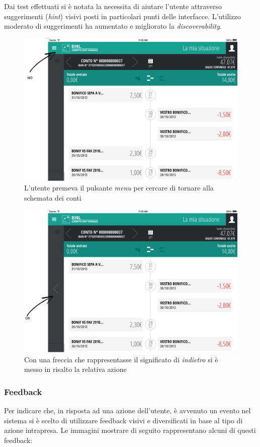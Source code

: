 Dai test effettuati si è notata la necessita di aiutare l'utente attraverso suggerimenti (\emph{hint}) visivi posti in particolari punti delle interfacce. L'utilizzo moderato di suggerimenti ha aumentato e migliorato la \emph{discoverability}. 
\begin{figure}[!htbp]
\centering
\includegraphics[scale=0.30]{ux/timelinenohint.png}
\caption{L'utente premeva il pulsante \emph{menu} per cercare di tornare alla schemata dei conti}
\end{figure}
\begin{figure}[!htbp]
\centering
\includegraphics[scale=0.30]{ux/timelinehint.png}
\caption{Con una freccia che rappresentasse il significato di \emph{indietro} si è messo in risalto la relativa azione}
\end{figure}

\subsubsection{Feedback}
Per indicare che, in risposta ad una azione dell'utente, è avvenuto un evento nel sistema  si è scelto di utilizzare feedback visivi e diversificati in base al tipo di azione intrapresa. 
Le immagini mostrare di seguito rappresentano alcuni di questi feedback:

